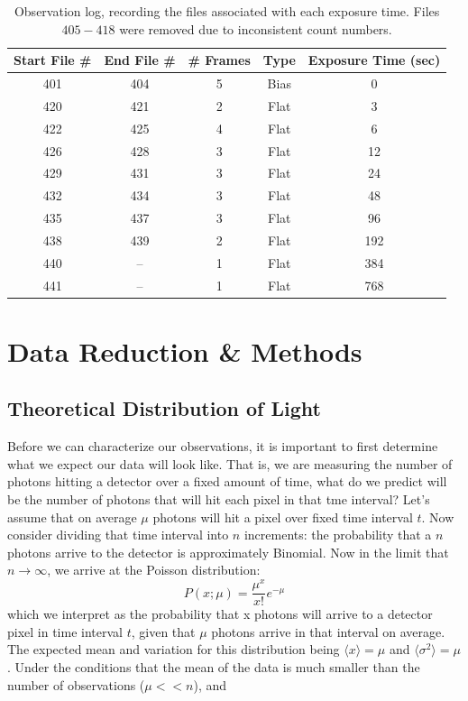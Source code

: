 \documentclass[preprint]{aastex62}
\begin{document}
\begin{table}[H]
\centering
\begin{tabular}{|c|c|c|c|c|}
    \hline
    Start File \# & End File \# & \# Frames & Type  & Exposure Time (sec) \\
    \hline
    \hline
    401 & 404 & 5 & Bias & 0  \\
    420 & 421 & 2 & Flat & 3 \\
    422 & 425 & 4 & Flat & 6 \\
    426 & 428 & 3 & Flat & 12 \\
    429 & 431 & 3 & Flat & 24 \\
    432 & 434 & 3 & Flat & 48 \\
    435 & 437 & 3 & Flat & 96 \\
    438 & 439 & 2 & Flat & 192 \\
    440 & --  & 1 & Flat & 384 \\
    441 & --  & 1 & Flat & 768 \\
    \hline
\end{tabular}
\caption{Observation log, recording the files associated with each exposure time. Files $405-418$ were removed due to inconsistent count numbers.} \label{table:log}
\end{table}


\section{Data Reduction \& Methods}
\subsection{Theoretical Distribution of Light}
Before we can characterize our observations, it is important to first determine what we expect our data will look like. That is, we are measuring the number of photons hitting a detector over a fixed amount of time, what do we predict will be the number of photons that will hit each pixel in that tme interval? Let's assume that on average $\mu$ photons will hit a pixel over fixed time interval $t$. Now consider dividing that time interval into $n$ increments: the probability that a $n$ photons arrive to the detector is approximately Binomial. Now in the limit that $n\rightarrow\infty$, we arrive at the Poisson distribution:
\begin{equation}
P(x;\mu) = \frac{\mu^x}{x!}e^{-\mu}
\end{equation}
which we interpret as the probability that x photons will arrive to a detector pixel in time interval $t$, given that $\mu$ photons arrive in that interval on average. The expected mean and variation for this distribution being $\langle x \rangle = \mu$ and $\langle \sigma^2 \rangle = \mu$. Under the conditions that the mean of the data is much smaller than the number of observations ($\mu << n$), and 
\end{document}
